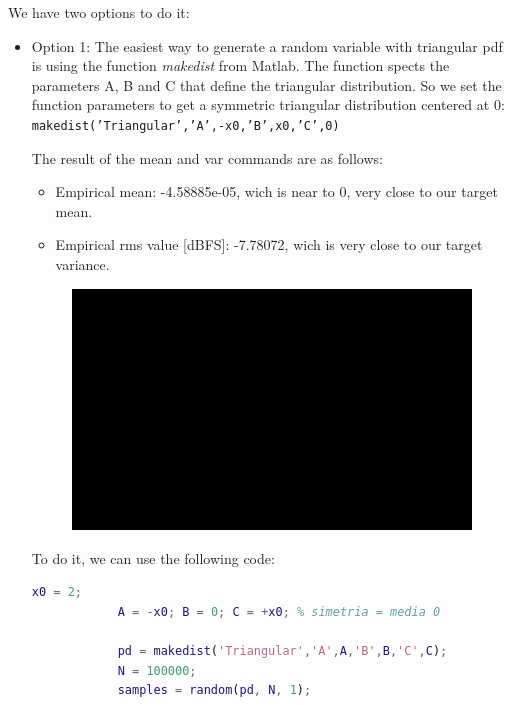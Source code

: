 \documentclass[11pt,a4paper]{article}
\begin{document}
\vspace{0.5cm}
We have two options to do it:
\begin{itemize}
    \item Option 1: The easiest way to generate a random variable with triangular pdf is using the function \textit{makedist} from Matlab.
          The function spects the parameters A, B and C that define the triangular distribution.
          So we set the function parameters to get a symmetric triangular distribution centered at 0: \texttt{makedist('Triangular','A',-x0,'B',x0,'C',0)}

          The result of the mean and var commands are as follows:
          \begin{itemize}
              \item Empirical mean: -4.58885e-05, wich is near to 0, very close to our target mean.
              \item Empirical rms value [dBFS]: -7.78072, wich is very close to our target variance.
          \end{itemize}

          \begin{figure}[H]
              \centering
              \includegraphics[width=1\textwidth]{img/task3_tri_mkdist.png}
              \label{fig:task3_tri_mkdist}
          \end{figure}

          To do it, we can use the following code:
          \begin{lstlisting}[language=Matlab]
            x0 = 2;
            A = -x0; B = 0; C = +x0; % simetria = media 0

            pd = makedist('Triangular','A',A,'B',B,'C',C);
            N = 100000;
            samples = random(pd, N, 1);


\end{lstlisting}
\end{itemize}
\end{document}
